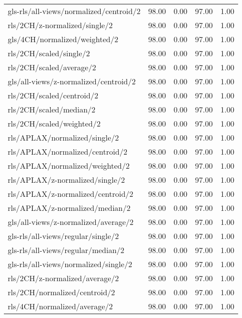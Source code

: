 \begin{longtable}{lrrrr}
    gls-rls/all-views/normalized/centroid/2   & 98.00 &  0.00 & 97.00 &  1.00 \\
    rls/2CH/z-normalized/single/2             & 98.00 &  0.00 & 97.00 &  1.00 \\
    gls/4CH/normalized/weighted/2             & 98.00 &  0.00 & 97.00 &  1.00 \\
    rls/2CH/scaled/single/2                   & 98.00 &  0.00 & 97.00 &  1.00 \\
    rls/2CH/scaled/average/2                  & 98.00 &  0.00 & 97.00 &  1.00 \\
    gls/all-views/z-normalized/centroid/2     & 98.00 &  0.00 & 97.00 &  1.00 \\
    rls/2CH/scaled/centroid/2                 & 98.00 &  0.00 & 97.00 &  1.00 \\
    rls/2CH/scaled/median/2                   & 98.00 &  0.00 & 97.00 &  1.00 \\
    rls/2CH/scaled/weighted/2                 & 98.00 &  0.00 & 97.00 &  1.00 \\
    rls/APLAX/normalized/single/2             & 98.00 &  0.00 & 97.00 &  1.00 \\
    rls/APLAX/normalized/centroid/2           & 98.00 &  0.00 & 97.00 &  1.00 \\
    rls/APLAX/normalized/weighted/2           & 98.00 &  0.00 & 97.00 &  1.00 \\
    rls/APLAX/z-normalized/single/2           & 98.00 &  0.00 & 97.00 &  1.00 \\
    rls/APLAX/z-normalized/centroid/2         & 98.00 &  0.00 & 97.00 &  1.00 \\
    rls/APLAX/z-normalized/median/2           & 98.00 &  0.00 & 97.00 &  1.00 \\
    gls/all-views/z-normalized/average/2      & 98.00 &  0.00 & 97.00 &  1.00 \\
    gls-rls/all-views/regular/single/2        & 98.00 &  0.00 & 97.00 &  1.00 \\
    gls-rls/all-views/regular/median/2        & 98.00 &  0.00 & 97.00 &  1.00 \\
    gls-rls/all-views/normalized/single/2     & 98.00 &  0.00 & 97.00 &  1.00 \\
    rls/2CH/z-normalized/average/2            & 98.00 &  0.00 & 97.00 &  1.00 \\
    rls/2CH/normalized/centroid/2             & 98.00 &  0.00 & 97.00 &  1.00 \\
    rls/4CH/normalized/average/2              & 98.00 &  0.00 & 97.00 &  1.00 \\

\end{longtable}
